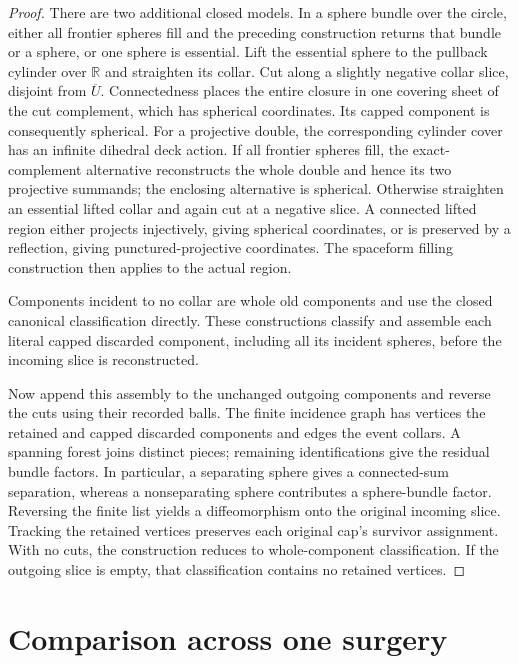 \begin{proof}
There are two additional closed models.  In a sphere bundle over the
circle, either all frontier spheres fill and the preceding construction
returns that bundle or a sphere, or one sphere is essential.  Lift the
essential sphere to the pullback cylinder over $\mathbb R$ and straighten
its collar.  Cut along a slightly negative collar slice, disjoint from
$\overline U$.  Connectedness places the entire closure in one covering
sheet of the cut complement, which has spherical coordinates.  Its
capped component is consequently spherical.
For a projective double, the corresponding cylinder cover has an infinite
dihedral deck action.  If all frontier spheres fill, the exact-complement
alternative reconstructs the whole double and hence its two projective
summands; the enclosing alternative is spherical.  Otherwise straighten
an essential lifted collar and again cut at a negative slice.  A connected
lifted region either projects injectively, giving spherical coordinates,
or is preserved by a reflection, giving punctured-projective coordinates.
The spaceform filling construction then applies to the actual region.

Components incident to no collar are whole old components and use the
closed canonical classification directly.  These constructions classify
and assemble each literal capped discarded component, including all its
incident spheres, before the incoming slice is reconstructed.

Now append this assembly to the unchanged outgoing components and
reverse the cuts using their recorded balls.  The finite incidence
graph has vertices the retained and capped discarded components and
edges the event collars.  A spanning forest joins distinct pieces;
remaining identifications give the residual bundle factors.  In
particular, a separating sphere gives a connected-sum separation,
whereas a nonseparating sphere contributes a sphere-bundle factor.
Reversing the finite list yields a diffeomorphism onto the original
incoming slice.  Tracking the retained vertices preserves each
original cap's survivor assignment.  With no cuts, the construction
reduces to whole-component classification.  If the outgoing slice
is empty, that classification contains no retained vertices.
\end{proof}

\section{Comparison across one surgery}
\label{sec:comparison}

